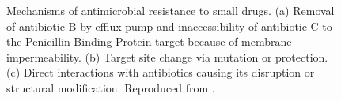 \begin{figure}[t]
\begin{center}
\caption[Mechanisms of antimicrobial resistance to small drugs]{Mechanisms of antimicrobial resistance to small drugs. (a) Removal of antibiotic B by efflux pump and inaccessibility of antibiotic C to the Penicillin Binding Protein target because of membrane impermeability. (b) Target site change via mutation or protection. (c) Direct interactions with antibiotics causing its disruption or structural modification. Reproduced from \citet{Blair2014}.} \label{fig:amr}
\end{center}
\end{figure}

